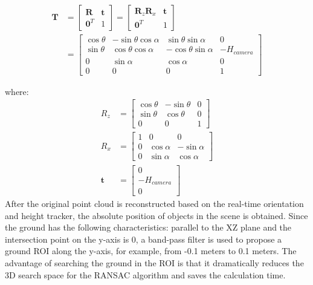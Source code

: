 \documentclass{ieeeaccess}
\begin{document}
\begin{equation}
\begin{aligned}
\textbf{T} &=
\begin{bmatrix}
  \textbf{R} & \textbf{t}\\ 
  \textbf{0}^T & 1
\end{bmatrix}
= 
\begin{bmatrix}
  \textbf{R}_z\textbf{R}_x & \textbf{t}\\ 
  \textbf{0}^T & 1
\end{bmatrix} 
\\
&=
\begin{bmatrix}
  \cos{\theta} & -\sin{\theta}\cos{\alpha} & \sin{\theta}\sin{\alpha} & 0\\ 
  \sin{\theta} & \cos{\theta}\cos{\alpha} & -\cos{\theta}\sin{\alpha} & -H_{camera} \\
  0 & \sin{\alpha} &\cos{\alpha}  & 0 \\
  0 & 0 & 0 & 1
\end{bmatrix}
\label{Equ:transform}
\end{aligned}
\end{equation}

where: 
\begin{equation}
\begin{aligned}
R_z&=
\begin{bmatrix}
   \cos{\theta} & -\sin{\theta} & 0 \\ 
  \sin{\theta} & \cos{\theta}   & 0\\
  0 & 0 &1
\end{bmatrix} \\
R_x&=
\begin{bmatrix}
   1& 0 & 0 \\ 
  0 & \cos{\alpha}   & -\sin{\alpha}\\
  0 & \sin{\alpha} & \cos{\alpha}
\end{bmatrix} \\
 \textbf{t} &= 
\begin{bmatrix}
 0\\ 
 -H_{camera}  \\
 0 
\end{bmatrix}
\label{Equ:roatation}
\end{aligned}
\end{equation}
After the original point cloud is reconstructed based on the real-time orientation and height tracker, the absolute position of objects in the scene is obtained. Since the ground has the following characteristics: parallel to the XZ plane and the intersection point on the y-axis is 0, a band-pass filter is used to propose a ground ROI along the y-axis, for example, from -0.1 meters to 0.1 meters. The advantage of searching the ground in the ROI is that it dramatically reduces the 3D search space for the RANSAC algorithm and saves the calculation time.
\end{document}
